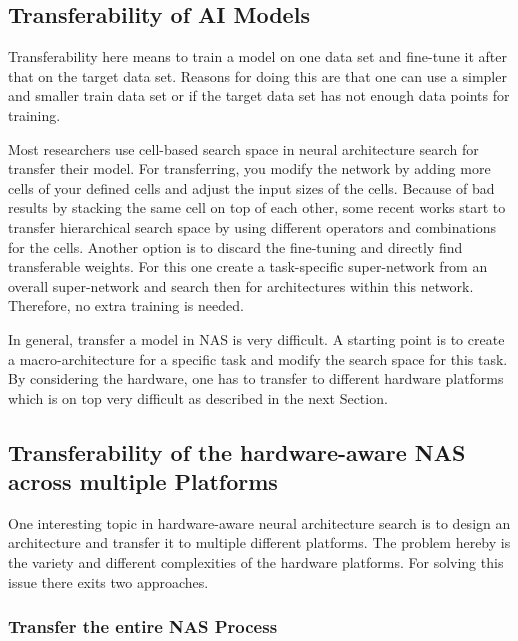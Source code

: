 \documentclass[conference]{IEEEtran}
\begin{document}
\subsection{Transferability of AI Models}

Transferability here means to train a model on one data set and fine-tune it after that on the target data set. Reasons for doing this are that one can use a simpler and smaller train data set or if the target data set has not enough data points for training. 

Most researchers use cell-based search space in neural architecture search for transfer their model. For transferring, you modify the network by adding more cells of your defined cells and adjust the input sizes of the cells. Because of bad results by stacking the same cell on top of each other, some recent works start to transfer hierarchical search space by using different operators and combinations for the cells. Another option is to discard the fine-tuning and directly find transferable weights. For this one create a task-specific super-network from an overall super-network and search then for architectures within this network. Therefore, no extra training is needed. 

In general, transfer a model in NAS is very difficult. A starting point is to create a macro-architecture for a specific task and modify the search space for this task. By considering the hardware, one has to transfer to different hardware platforms which is on top very difficult as described in the next Section. 
 
\subsection{Transferability of the hardware-aware NAS across multiple Platforms}

One interesting topic in hardware-aware neural architecture search is to design an architecture and transfer it to multiple different platforms. The problem hereby is the variety and different complexities of the hardware platforms. For solving this issue there exits two approaches.

\subsubsection{Transfer the entire NAS Process}
\end{document}
